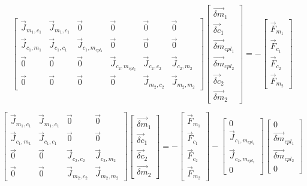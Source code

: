  \begin{equation}
 \label{eqn:coupling_1}
 \begin{bmatrix} 
 \vec{J}_{m_1,c_1} & \vec{J}_{m_1,c_1} & \vec{0} & \vec{0} & \vec{0} & \vec{0}\\
 \vec{J}_{c_1,m_1} & \vec{J}_{c_1,c_1} & \vec{J}_{c_1,m_{cpl_1}} & \vec{0} & \vec{0} & \vec{0} \\
 \vec{0} & \vec{0} & \vec{0} & \vec{J}_{c_2,m_{cpl_2}} & \vec{J}_{c_2,c_2} & \vec{J}_{c_2,m_2} \\ 
 \vec{0} & \vec{0} & \vec{0} & \vec{0} & \vec{J}_{m_2,c_2} & \vec{J}_{m_2,m_2}  
 \end{bmatrix} \begin{bmatrix}
 \vec{\delta m}_{1} \\ \vec{\delta c}_{1} \\
 \vec{\delta m}_{cpl_1} \\ \vec{\delta m}_{cpl_2} \\
 \vec{\delta c}_{2} \\ \vec{\delta m}_{2}
\end{bmatrix}  = -\begin{bmatrix}
 \vec{F}_{m_1} \\ \vec{F}_{c_1} \\
 \vec{F}_{c_2} \\ \vec{F}_{m_2} \end{bmatrix}
 \end{equation}

 \begin{equation}
 \label{eqn:coupling_2}
 \begin{bmatrix} 
 \vec{J}_{m_1,c_1} & \vec{J}_{m_1,c_1} & \vec{0} & \vec{0}\\
 \vec{J}_{c_1,m_1} & \vec{J}_{c_1,c_1} & \vec{0} & \vec{0} \\
 \vec{0} & \vec{0} & \vec{J}_{c_2,c_2} & \vec{J}_{c_2,m_2} \\ 
 \vec{0} & \vec{0} & \vec{J}_{m_2,c_2} & \vec{J}_{m_2,m_2}  
 \end{bmatrix} \begin{bmatrix}
 \vec{\delta m}_{1} \\ \vec{\delta c}_{1} \\
 \vec{\delta c}_{2} \\ \vec{\delta m}_{2}
\end{bmatrix}  = -\begin{bmatrix}
 \vec{F}_{m_1} \\ \vec{F}_{c_1} \\ \vec{F}_{c_2} \\ \vec{F}_{m_2} \end{bmatrix} - \begin{bmatrix}
 0 \\ \vec{J}_{c_1,m_{cpl_1}} \\ \vec{J}_{c_2,m_{cpl_2}} \\ 0
 \end{bmatrix}\begin{bmatrix}
 0 \\ \vec{\delta m}_{cpl_1} \\ \vec{\delta m}_{cpl_2} \\ 0
 \end{bmatrix}
 \end{equation}
 
